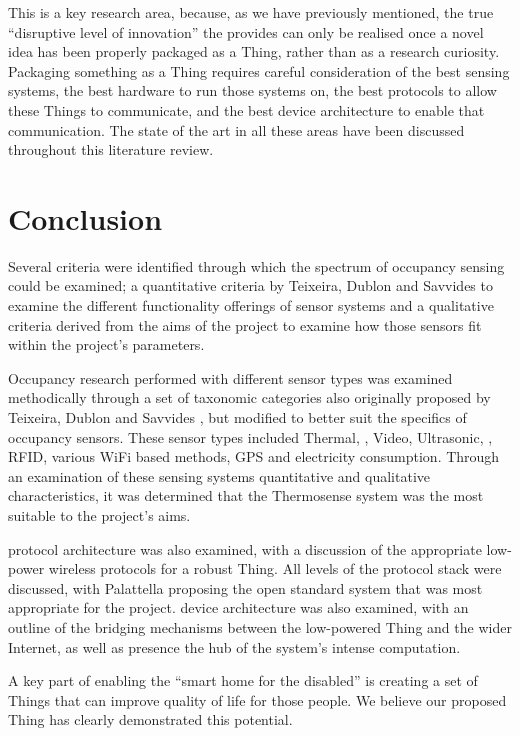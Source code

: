 \documentclass[../thesis/thesis.tex]{subfiles}
\begin{document}
This is a key research area, because, as we have previously mentioned, the true ``disruptive level of innovation''\cite{atzori2010internet} the \iot provides can only be realised once a novel idea has been properly packaged as a Thing, rather than as a research curiosity. Packaging something as a Thing requires careful consideration of the best sensing systems, the best hardware to run those systems on, the best protocols to allow these Things to communicate, and the best device architecture to enable that communication. The state of the art in all these areas have been discussed throughout this literature review.

\section{Conclusion}
\label{sec:litreview:conclusion}
Several criteria were identified through which the spectrum of occupancy sensing could be examined; a quantitative criteria by Teixeira, Dublon and Savvides \cite{teixeira2010survey} to examine the different functionality offerings of sensor systems and a qualitative criteria derived from the aims of the project to examine how those sensors fit within the project's parameters.

Occupancy research performed with different sensor types was examined methodically through a set of taxonomic categories also originally proposed by Teixeira, Dublon and Savvides \cite{teixeira2010survey}, but modified to better suit the specifics of occupancy sensors. These sensor types included Thermal, \cdi, Video, Ultrasonic, \pir, RFID, various WiFi based methods, GPS and electricity consumption. Through an examination of these sensing systems quantitative and qualitative characteristics, it was determined that the Thermosense \iar system \cite{beltran2013thermosense} was the most suitable to the project's aims.

\iot protocol architecture was also examined, with a discussion of the appropriate low-power wireless protocols for a robust Thing. All levels of the protocol stack were discussed, with Palattella \etal \cite{palattella2013standardized} proposing the open standard system that was most appropriate for the project. \iot device architecture was also examined, with an outline of the bridging mechanisms between the low-powered Thing and the wider Internet, as well as presence the hub of the system's intense computation.

A key part of enabling the ``smart home for the disabled'' is creating a set of Things that can improve quality of life for those people. We believe our proposed Thing has clearly demonstrated this potential.

\end{document}
